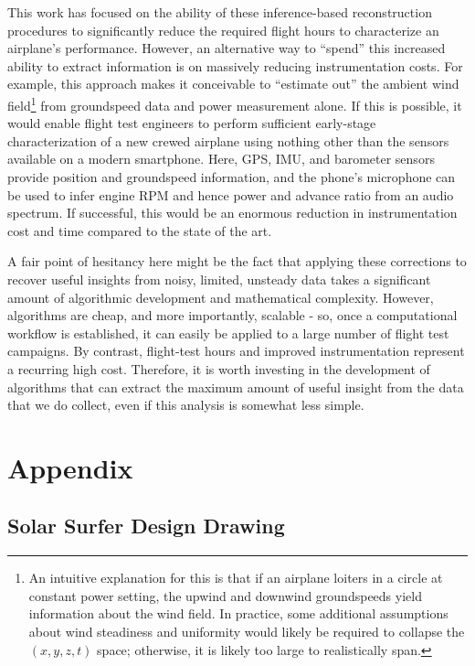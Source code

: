 \documentclass[conf]{new-aiaa}
\begin{document}
    This work has focused on the ability of these inference-based reconstruction procedures to significantly reduce the required flight hours to characterize an airplane's performance. However, an alternative way to ``spend'' this increased ability to extract information is on massively reducing instrumentation costs. For example, this approach makes it conceivable to ``estimate out'' the ambient wind field\footnote{An intuitive explanation for this is that if an airplane loiters in a circle at constant power setting, the upwind and downwind groundspeeds yield information about the wind field. In practice, some additional assumptions about wind steadiness and uniformity would likely be required to collapse the $(x, y, z, t)$ space; otherwise, it is likely too large to realistically span.} from groundspeed data and power measurement alone. If this is possible, it would enable flight test engineers to perform sufficient early-stage characterization of a new crewed airplane using nothing other than the sensors available on a modern smartphone. Here, GPS, IMU, and barometer sensors provide position and groundspeed information, and the phone's microphone can be used to infer engine RPM and hence power and advance ratio from an audio spectrum. If successful, this would be an enormous reduction in instrumentation cost and time compared to the state of the art.

    A fair point of hesitancy here might be the fact that applying these corrections to recover useful insights from noisy, limited, unsteady data takes a significant amount of algorithmic development and mathematical complexity. However, algorithms are cheap, and more importantly, scalable - so, once a computational workflow is established, it can easily be applied to a large number of flight test campaigns. By contrast, flight-test hours and improved instrumentation represent a recurring high cost. Therefore, it is worth investing in the development of algorithms that can extract the maximum amount of useful insight from the data that we do collect, even if this analysis is somewhat less simple.



    \clearpage


    \section{Appendix}

    \subsection{Solar Surfer Design Drawing}
    \label{sec:solar_surfer_drawing}
\end{document}
